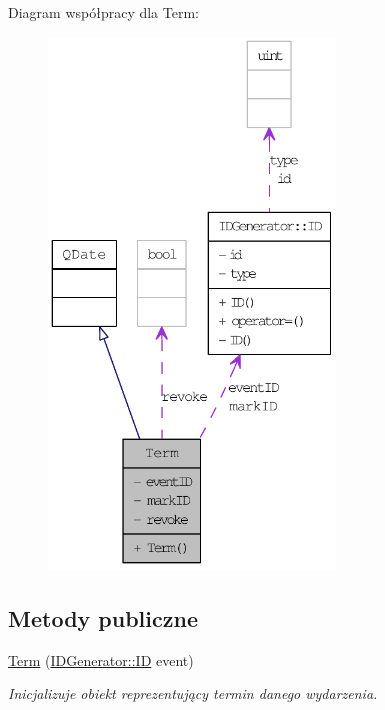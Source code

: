 Diagram współpracy dla Term:\nopagebreak
\begin{figure}[H]
\begin{center}
\leavevmode
\includegraphics[height=400pt]{classTerm__coll__graph}
\end{center}
\end{figure}
\subsection*{Metody publiczne}
\begin{DoxyCompactItemize}
\item 
\hyperlink{classTerm_a8621decf6499e1b597de930add62240a}{Term} (\hyperlink{classIDGenerator_1_1ID}{IDGenerator::ID} event)
\begin{DoxyCompactList}\small\item\em Inicjalizuje obiekt reprezentujący termin danego wydarzenia. \item\end{DoxyCompactList}\end{DoxyCompactItemize}
